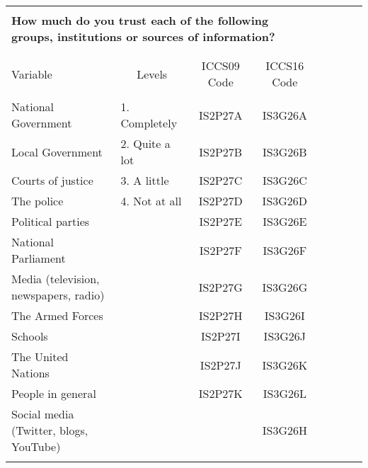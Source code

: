 \documentclass{article}
\begin{document}
\begin{table}[H] 
\centering 
  \label{table:1} 
\begin{tabular}{@{\extracolsep{3pt}}lccccccc} 
\\[-5ex]
\hline \\[-3ex] 
\multicolumn{4}{l}{\textbf{How much do you trust each of the following groups, institutions or sources of information?}} \\ 
\\[-3ex]
\hline \\[-3ex] 
Variable & Levels & \multicolumn{1}{c}{ICCS09 Code} & \multicolumn{1}{c}{ICCS16 Code} \\ 
\hline \\[-3ex] 
National Government & \multicolumn{1}{l}{1. Completely} & IS2P27A & IS3G26A \\ 
Local Government  & \multicolumn{1}{l}{2. Quite a lot} & IS2P27B & IS3G26B \\ 
Courts of justice & \multicolumn{1}{l}{3. A little} & IS2P27C & IS3G26C \\ 
The police & \multicolumn{1}{l}{4. Not at all} & IS2P27D & IS3G26D \\ 
Political parties &  & IS2P27E & IS3G26E \\ 
National Parliament & & IS2P27F & IS3G26F  \\ 
Media (television, newspapers, radio) & & IS2P27G & IS3G26G  \\ 
The Armed Forces & & IS2P27H & IS3G26I \\ 
Schools & & IS2P27I & IS3G26J  \\ 
The United Nations &  & IS2P27J & IS3G26K  \\ 
People in general & & IS2P27K & IS3G26L \\ 
Social media (Twitter, blogs, YouTube) & &  & IS3G26H \\ 
\hline \\[-1.8ex] 
\end{tabular} 
\end{table} 

\break
\end{document}
